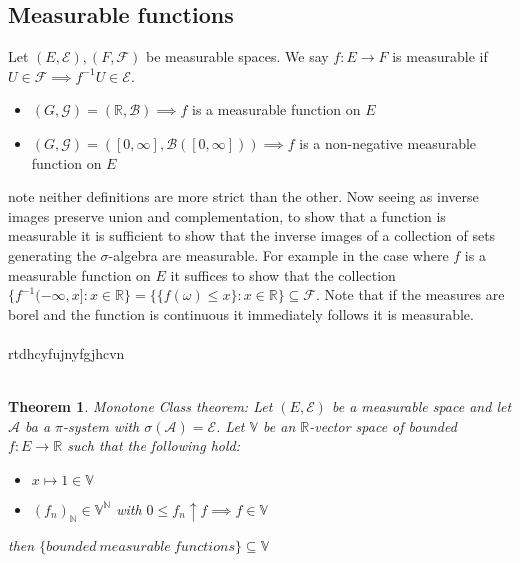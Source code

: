 \documentclass{article}
\newtheorem{theorem}{Theorem}[section]
\begin{document}
\subsection{Measurable functions}
Let $(E,\mathcal E),(F,\mathcal F)$ be measurable spaces.  We say $f:E\rightarrow F$ is measurable if $U\in\mathcal F \implies f^{-1}U\in \mathcal E$.
\begin{itemize}
  \item $(G,\mathcal G)=(\mathbb R,\mathcal B)\implies f$ is a measurable function on $E$
  \item $(G,\mathcal G)=([0,\infty],\mathcal B([0,\infty]))\implies f$ is a non-negative measurable function on $E$
\end{itemize}
note neither definitions are more strict than the other.  Now seeing as inverse images preserve union and complementation, to show that a function is measurable it is sufficient to show that the inverse images of a collection of sets generating the $\sigma$-algebra are measurable.  For example in the case where $f$ is a measurable function on $E$ it suffices to show that the collection $\{f^{-1}(-\infty,x]:x\in\mathbb R\}=\{\{f(\omega)\leq x\}:x\in\mathbb R\}\subseteq\mathcal F$.  Note that if the measures are borel and the function is continuous it immediately follows it is measurable.
\\
\\
rtdhcyfujnyfgjhcvn
\\
\\
\begin{theorem}
  Monotone Class theorem: Let $(E,\mathcal E)$ be a measurable space and let $\mathcal A$ ba a $\pi$-system with $\sigma(\mathcal A)=\mathcal E$.  Let $\mathbb V$ be an $\mathbb{R}$-vector space of bounded $f:E\rightarrow\mathbb{R}$ such that the following hold:
  \begin{itemize}
    \item $x\mapsto1\in\mathbb V$
    \item $(f_n)_\mathbb{N}\in\mathbb V^\mathbb{N}$ with $0\leq f_n \uparrow f\implies f\in\mathbb V$
  \end{itemize}
  then $\{bounded~measurable~functions\}\subseteq\mathbb V$
\end{theorem}
\end{document}
